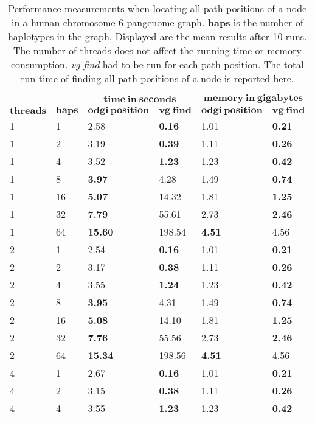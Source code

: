 \begin{table}[!ht]
	\centering
	\caption{\label{tab:position} Performance measurements when locating all path positions of a node in a human chromosome 6 pangenome graph. \textbf{haps} is the number of haplotypes in the graph. Displayed are the mean results after 10 runs. The number of threads does not affect the running time or memory consumption. \textit{vg find} had to be run for each path position. The total run time of finding all path positions of a node is reported here.}
	\begin{tabular}{@{}llllll@{}}
		& & \multicolumn{2}{c}{$\mathbf{time\ in\ seconds}$} & \multicolumn{2}{c}{$\mathbf{memory\ in\ gigabytes}$} \\ \cmidrule(lr){3-4} \cmidrule(lr){5-6}
		{$\mathbf{threads}$} & {$\mathbf{haps}$} & {$\mathbf{odgi\ position}$} & {$\mathbf{vg\ find}$} & {$\mathbf{odgi\ position}$} & {$\mathbf{vg\ find}$} \\ \hline
		1 & 1 & 2.58 & \textbf{0.16} & 1.01 & \textbf{0.21} \\ 
		1 & 2 & 3.19 & \textbf{0.39} & 1.11 & \textbf{0.26} \\ 
		1 & 4 & 3.52 & \textbf{1.23} & 1.23 & \textbf{0.42} \\ 
		1 & 8 & \textbf{3.97} & 4.28 & 1.49 & \textbf{0.74} \\ 
		1 & 16 & \textbf{5.07} & 14.32 & 1.81 & \textbf{1.25} \\ 
		1 & 32 & \textbf{7.79} & 55.61 & 2.73 & \textbf{2.46} \\ 
		1 & 64 & \textbf{15.60} & 198.54 & \textbf{4.51} & 4.56 \\ \midrule
		2 & 1 & 2.54 & \textbf{0.16} & 1.01 & \textbf{0.21} \\ 
		2 & 2 & 3.17 & \textbf{0.38} & 1.11 & \textbf{0.26} \\ 
		2 & 4 & 3.55 & \textbf{1.24} & 1.23 & \textbf{0.42} \\ 
		2 & 8 & \textbf{3.95} & 4.31 & 1.49 & \textbf{0.74} \\ 
		2 & 16 & \textbf{5.08} & 14.10 & 1.81 & \textbf{1.25} \\ 
		2 & 32 & \textbf{7.76} & 55.56 & 2.73 & \textbf{2.46} \\ 
		2 & 64 & \textbf{15.34} & 198.56 & \textbf{4.51} & 4.56 \\ \midrule
		4 & 1 & 2.67 & \textbf{0.16} & 1.01 & \textbf{0.21} \\ 
		4 & 2 & 3.15 & \textbf{0.38} & 1.11 & \textbf{0.26} \\ 
		4 & 4 & 3.55 & \textbf{1.23} & 1.23 & \textbf{0.42} \\ 

\end{tabular}
\end{table}
